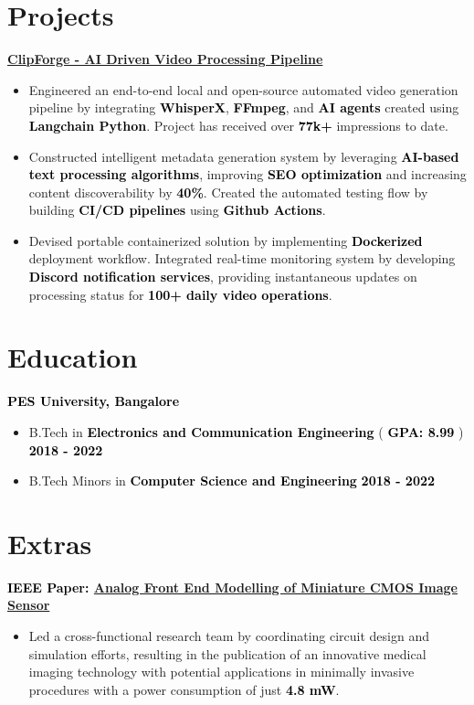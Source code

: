 \documentclass[a4paper,10pt]{article}
\newcommand{\bb}[1]{\textcolor{black}{\textbf{#1}}}
\begin{document}
\section{Projects}
\bb{\href{https://github.com/rajathjn/shorts_maker}{ClipForge - AI Driven Video Processing Pipeline}}
\begin{itemize}[nosep, leftmargin=2em, itemsep=3pt]
    \item Engineered an end-to-end local and open-source automated video generation pipeline by integrating \bb{WhisperX}, \bb{FFmpeg}, and \bb{AI agents} created using \bb{Langchain Python}. Project has received over \bb{77k+} impressions to date.
    \item Constructed intelligent metadata generation system by leveraging \bb{AI-based text processing algorithms}, improving \bb{SEO optimization} and increasing content discoverability by \bb{40\%}. Created the automated testing flow by building \bb{CI/CD pipelines} using \bb{Github Actions}.
    \item Devised portable containerized solution by implementing \bb{Dockerized} deployment workflow. Integrated real-time monitoring system by developing \bb{Discord notification services}, providing instantaneous updates on processing status for \bb{100+ daily video operations}.
\end{itemize}
\vspace{-1em}
%
%
\section{Education}
\bb{ PES University, Bangalore }
\begin{itemize}[nosep, leftmargin=2em, itemsep=3pt]
    \item B.Tech in \bb{Electronics and Communication Engineering} ( \bb{GPA: 8.99} ) \hfill \bb{2018 - 2022}
    \item B.Tech Minors in \bb{Computer Science and Engineering} \hfill \bb{2018 - 2022}
\end{itemize}
\vspace{-1em}
%
%
\section{Extras}
\bb{IEEE Paper: \href{https://ieeexplore.ieee.org/document/9865797}{Analog Front End Modelling of Miniature CMOS Image Sensor}}
\begin{itemize}[nosep, leftmargin=2em, itemsep=3pt]
    \item Led a cross-functional research team by coordinating circuit design and simulation efforts, resulting in the publication of an innovative medical imaging technology with potential applications in minimally invasive procedures with a power consumption of just \bb{4.8 mW}.
\end{itemize}
%
%
\end{document}
